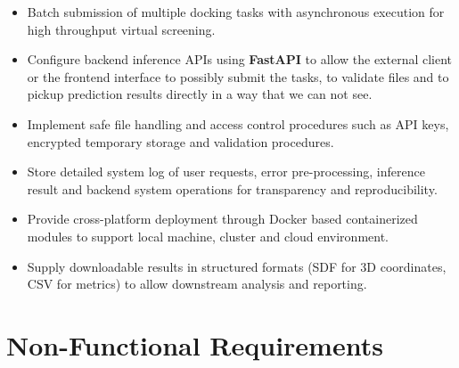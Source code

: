 \documentclass[12pt,a4]{report}
\begin{document}
\begin{itemize}
\item Batch submission of multiple docking tasks with asynchronous execution for high throughput virtual screening.

\item Configure backend inference APIs using \textbf{FastAPI} to allow the external client or the frontend interface to possibly submit the tasks, to validate files and to pickup prediction results directly in a way that we can not see.

\item Implement safe file handling and access control procedures such as API keys, encrypted temporary storage and validation procedures.

\item Store detailed system log of user requests, error pre-processing, inference result and backend system operations for transparency and reproducibility.

\item Provide cross-platform deployment through Docker based containerized modules to support local machine, cluster and cloud environment.

\item Supply downloadable results in structured formats (SDF for 3D coordinates, CSV for metrics) to allow downstream analysis and reporting.

\end{itemize}

\section{Non-Functional Requirements}
\end{document}
